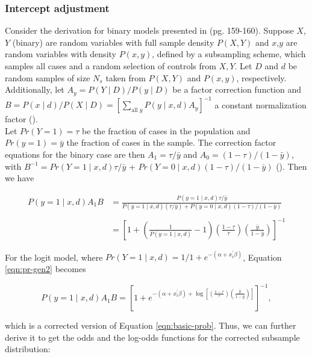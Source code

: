 \subsubsection{Intercept adjustment}

Consider the derivation for binary models presented in \textcite{king2001logistic} (pg. 159-160). Suppose $X$, $Y$ (binary) are random variables with full sample density $P(X, Y)$ and $x$,$y$ are random variables with density $P(x,y)$, defined by a subsampling scheme, which samples all cases and a random selection of controls from $X, Y$. Let $D$ and $d$ be random samples of size $N_s$ taken from $P(X, Y)$ and $P(x, y)$, respectively. Additionally, let $A_y=P(Y \mid D)/P(y \mid D)$ be a factor correction function  and $B=P(x \mid d)/P(X \mid D)=\left[\sum_{\text {all } y} P(y \mid x, d) A_y\right]^{-1}$ a constant normalization factor (\cite{king2001logistic}).\\

Let $Pr(Y=1)= \tau$ be the fraction of cases in the population and $Pr(y=1)= \bar{y}$ the fraction of cases in the sample. The correction factor equations for the binary case are then $A_1=\tau/\bar{y}$ and $A_0=(1-\tau)/(1-\bar{y})$, with $B^{-1}=Pr(Y=1 \mid x, d)\tau/\bar{y}$ + $Pr(Y=0 \mid x, d)(1-\tau)/ (1-\bar{y})$ (\cite{king2001logistic}). Then we have

\begin{align}
    P(y=1 \mid x, d) A_1 B &= \frac{P(y=1 \mid x, d) \tau / \bar{y}}{P(y=1 \mid x, d)(\tau / \bar{y})+P(y=0 \mid x, d)(1-\tau) /(1-\bar{y})} \label{eqn:pr-gen1}\\
    \nonumber \\
    & =\left[1+\left(\frac{1}{P(y=1 \mid x, d)}-1\right)\left(\frac{1-\tau}{\tau}\right)\left(\frac{\bar{y}}{1-\bar{y}}\right)\right]^{-1}
    \label{eqn:pr-gen2}
\end{align}


For the logit model, where $Pr(Y=1 \mid x, d) = 1/1+e^{-(\alpha + x_i^\prime \beta)}$, Equation \ref{eqn:pr-gen2} becomes

\begin{equation}
    \nonumber P(y=1 \mid x, d) A_1 B=\left[1+e^{-(\alpha + x_i^{\prime} \beta) +\log \left[\left(\frac{1-\tau}{\tau}\right)\left(\frac{\bar{y}}{1-\bar{y}}\right)\right]}\right]^{-1},
    \label{eqn:pr-logit}
\end{equation}

which is a corrected version of Equation \ref{eqn:basic-prob}. Thus, we can further derive it to get the odds and the log-odds functions for the corrected subsample distribution:

